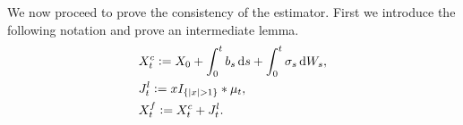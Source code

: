 \begin{comment} \subsection{Finite activity \levy jumps}
In order to demonstrate that the global estimator of spot volatility is consistent, we will proceed in stages.  First suppose the price process specified in all generality in \eqref{eq:generalsemimartingale} experiences at most a finite number of \levy jumps in any finite time interval. That is we assume that $X$ has finite activity  \levy jumps, which is equivalent to $\nu$ being finite on the complement of   $\{0\}$. The finite activity assumption  also implies that the price process may be expressed as  
\end{comment}
We now proceed to prove the consistency of the estimator. First we introduce the following notation and prove an intermediate lemma.  
\begin{align}
  &X_t^c :=  X_0 + \int_0^t b_s \D s + \int_0^t \sigma_s \D W_s, \notag\\ 
  &J^l_t :=  xI_{\{\vert x \vert > 1 \}} \ast \mu_t, \notag \\
  &X^f_t := X^c_t + J^l_t. 
  \label{jumpfa}
\end{align}
\begin{comment}
for $t \in \domain$ where the $Y_i$'s are  \iid jump sizes; $N$ is a Poisson process with intensity $\lambda$, independent of each $Y_i$. Under this conditions, we have the following:
\end{comment}

